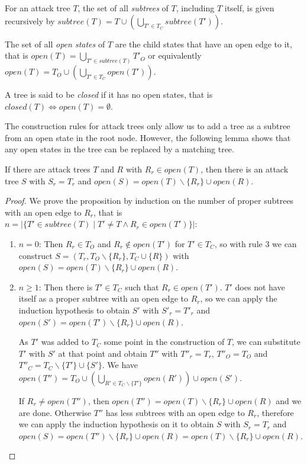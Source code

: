 \begin{definition}
  For an attack tree $T$, the set of all \emph{subtrees} of $T$,
  including $T$ itself, is given recursively by
  $subtree(T) = T ∪ \left(⋃_{T' ∈ T_C} subtree(T') \right)$.
  
  The set of all \emph{open states} of $T$ are the child states that
  have an open edge to it, that is $open(T) = ⋃_{T' ∈ subtree(T)} T'_O$
  or equivalently $open(T) = T_O ∪ \left(⋃_{T' ∈ T_C} open(T') \right)$.
  
  A tree is said to be \emph{closed} if it has no open states, that is
  $closed(T) \iff open(T) = ∅$.
\end{definition}

The construction rules for attack trees only allow us to add a tree
as a subtree from an open state in the root node.
However, the following lemma shows that any open states in the tree
can be replaced by a matching tree.

\begin{lemma}
  \label{lemma:tree-composition}
  If there are attack trees $T$ and $R$ with
  $R_r ∈ open(T)$,
  then there is an attack tree $S$ with
  $S_r = T_r$ and
  $open(S) = open(T) ∖ \{R_r\} ∪ open(R)$.
\end{lemma}
\begin{proof}
  We prove the proposition by induction on the number of proper subtrees
  with an open edge to $R_r$, that is
  $n = |\{ T' ∈ subtree(T) \mid T' ≠ T ∧ R_r ∈ open(T')\}|$:
  \begin{enumerate}
    \item $n = 0$:
      Then $R_r ∈ T_O$ and $R_r ∉ open(T')$ for $T' ∈ T_C$,
      so with rule 3 we can construct
      $S = (T_r, T_O ∖ \{R_r\}, T_C ∪ \{R\})$ with
      $open(S) = open(T) ∖ \{R_r\} ∪ open(R)$.
    \item $n ≥ 1$:
      Then there is $T' ∈ T_C$ such that $R_r ∈ open(T')$.
      $T'$ does not have itself as a proper subtree
      with an open edge to $R_r$, so we can apply
      the induction hypothesis to obtain
      $S'$ with $S'_r = T'_r$ and
      $open(S') = open(T') ∖ \{R_r\} ∪ open(R)$.

      As $T'$ was added to $T_C$ some point in the construction of $T$,
      we can substitute $T'$ with $S'$ at that point and obtain
      $T''$ with $T''_r = T_r$, $T''_O = T_O$ and
      $T''_C = T_C ∖ \{T'\} ∪ \{S'\}$.
      We have $open(T'') = T_O ∪ \left(⋃_{R' ∈ T_C ∖ \{T'\} } open(R')\right) ∪ open(S')$.

      If $R_r ≠ open(T'')$, then $open(T'') = open(T) ∖ \{R_r\} ∪ open(R)$ and we are done.
      Otherwise $T''$ has less subtrees with an open edge to
      $R_r$, therefore we
      can apply the induction hypothesis on it to obtain
      $S$ with $S_r = T_r$ and
      $open(S) = open(T'') ∖ \{R_r\} ∪ open(R) = open(T) ∖ \{R_r\} ∪ open(R)$.
  \end{enumerate}
\end{proof}

